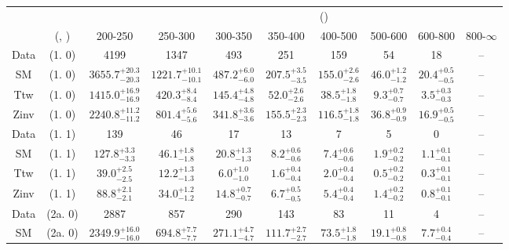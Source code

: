 \begin{table}[h!]
\tiny
\centering
{}
\begin{tabular}
{cccccccccc}
	\hline\hline
&	&	& \multicolumn{8}{c}{\scalht (\gev)}\\ 
	&	 (\njet, \nb) & 200-250 & 250-300 & 300-350 & 350-400 & 400-500 & 500-600 & 600-800 & 800-$\infty$ \\ [0.8ex] 
\hline
	Data & (1. 0) & 4199 & 1347 & 493 & 251 & 159 & 54 & 18 & -- \\[0.5ex] 
	SM & (1. 0) & $3655.7^{+ 20.3 }_{- 20.3 }$ & $1221.7^{+ 10.1 }_{- 10.1 }$ & $487.2^{+ 6.0 }_{- 6.0 }$ & $207.5^{+ 3.5 }_{- 3.5 }$ & $155.0^{+ 2.6 }_{- 2.6 }$ & $46.0^{+ 1.2 }_{- 1.2 }$ & $20.4^{+ 0.5 }_{- 0.5 }$ & -- \\[0.5ex] 
	Ttw & (1. 0) & $1415.0^{+ 16.9 }_{- 16.9 }$ & $420.3^{+ 8.4 }_{- 8.4 }$ & $145.4^{+ 4.8 }_{- 4.8 }$ & $52.0^{+ 2.6 }_{- 2.6 }$ & $38.5^{+ 1.8 }_{- 1.8 }$ & $9.3^{+ 0.7 }_{- 0.7 }$ & $3.5^{+ 0.3 }_{- 0.3 }$ & -- \\[0.5ex] 
	Zinv & (1. 0) & $2240.8^{+ 11.2 }_{- 11.2 }$ & $801.4^{+ 5.6 }_{- 5.6 }$ & $341.8^{+ 3.6 }_{- 3.6 }$ & $155.5^{+ 2.3 }_{- 2.3 }$ & $116.5^{+ 1.8 }_{- 1.8 }$ & $36.8^{+ 0.9 }_{- 0.9 }$ & $16.9^{+ 0.5 }_{- 0.5 }$ & -- \\[0.5ex] 
	Data & (1. 1) & 139 & 46 & 17 & 13 & 7 & 5 & 0 & -- \\[0.5ex] 
	SM & (1. 1) & $127.8^{+ 3.3 }_{- 3.3 }$ & $46.1^{+ 1.8 }_{- 1.8 }$ & $20.8^{+ 1.3 }_{- 1.3 }$ & $8.2^{+ 0.6 }_{- 0.6 }$ & $7.4^{+ 0.6 }_{- 0.6 }$ & $1.9^{+ 0.2 }_{- 0.2 }$ & $1.1^{+ 0.1 }_{- 0.1 }$ & -- \\[0.5ex] 
	Ttw & (1. 1) & $39.0^{+ 2.5 }_{- 2.5 }$ & $12.2^{+ 1.3 }_{- 1.3 }$ & $6.0^{+ 1.0 }_{- 1.0 }$ & $1.6^{+ 0.4 }_{- 0.4 }$ & $2.0^{+ 0.4 }_{- 0.4 }$ & $0.5^{+ 0.2 }_{- 0.2 }$ & $0.3^{+ 0.1 }_{- 0.1 }$ & -- \\[0.5ex] 
	Zinv & (1. 1) & $88.8^{+ 2.1 }_{- 2.1 }$ & $34.0^{+ 1.2 }_{- 1.2 }$ & $14.8^{+ 0.7 }_{- 0.7 }$ & $6.7^{+ 0.5 }_{- 0.5 }$ & $5.4^{+ 0.4 }_{- 0.4 }$ & $1.4^{+ 0.2 }_{- 0.2 }$ & $0.8^{+ 0.1 }_{- 0.1 }$ & -- \\[0.5ex] 
	Data & (2a. 0) & 2887 & 857 & 290 & 143 & 83 & 11 & 4 & -- \\[0.5ex] 
	SM & (2a. 0) & $2349.9^{+ 16.0 }_{- 16.0 }$ & $694.8^{+ 7.7 }_{- 7.7 }$ & $271.1^{+ 4.7 }_{- 4.7 }$ & $111.7^{+ 2.7 }_{- 2.7 }$ & $73.5^{+ 1.8 }_{- 1.8 }$ & $19.1^{+ 0.8 }_{- 0.8 }$ & $7.7^{+ 0.4 }_{- 0.4 }$ & -- \\[0.5ex] 

\end{tabular}
\end{table}
